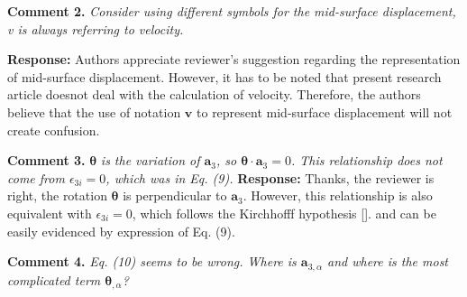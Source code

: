 \documentclass{article}
\begin{document}
\textbf{Comment 2.} \textit{Consider using different symbols for the mid-surface displacement, v is always referring to velocity.}

\textbf{Response:} Authors appreciate reviewer's suggestion regarding the representation of mid-surface displacement. However, it has to be noted that present research article doesnot deal with the calculation of velocity. Therefore, the authors believe that the use of notation $\boldsymbol v$ to represent mid-surface displacement will not create confusion. 

\textbf{Comment 3.} $\boldsymbol \theta$ \textit{is the variation of $\boldsymbol a_3$, so $\boldsymbol \theta \cdot \boldsymbol a_3=0$. This relationship does not come from $\epsilon_{3i} = 0$, which was in Eq. (9).}
\textbf{Response:} Thanks, the reviewer is right, the rotation $\boldsymbol \theta$ is perpendicular to $\boldsymbol a_3$. However, this relationship is also equivalent with $\epsilon_{3i}=0$, which follows the Kirchhofff hypothesis []. and can be easily evidenced by expression of Eq. (9).

\textbf{Comment 4.} \textit{Eq. (10) seems to be wrong. Where is $\boldsymbol a_{3,\alpha}$ and where is the most complicated term $\boldsymbol \theta_{,\alpha}$?}
\end{document}
